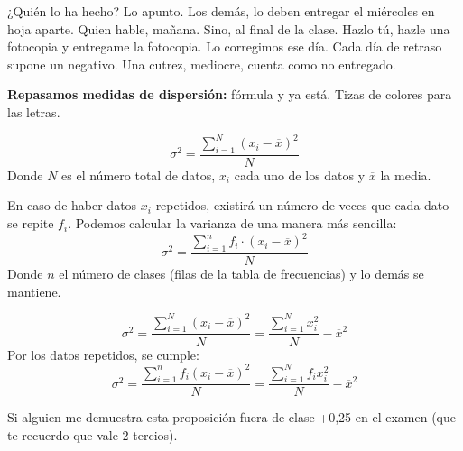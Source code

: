 ¿Quién lo ha hecho? Lo apunto. 
%
Los demás, lo deben entregar el miércoles en hoja aparte.
%
Quien hable, mañana.
%
Sino, al final de la clase.
%
Hazlo tú, hazle una fotocopia y entregame la fotocopia. 
%
Lo corregimos ese día.
%
Cada día de retraso supone un negativo.
%
Una cutrez, mediocre, cuenta como no entregado.



\textbf{Repasamos medidas de dispersión: } fórmula y ya está. Tizas de colores para las letras.

\begin{defn}[Varianza]
\[
	\sigma^2 = \frac{\displaystyle\sum_{i=1}^{N} \left(x_i-\overline{x}\right)^2}{N}
\]
Donde $N$ es el número total de datos, $x_i$ cada uno de los datos y $\overline{x}$ la media.

\obs En caso de haber datos $x_i$ repetidos, existirá un número de veces que cada dato se repite $f_i$. 
%
Podemos calcular la varianza de una manera más sencilla:
\[
	\sigma^2 = \frac{\displaystyle\sum_{i=1}^{n} f_i·\left(x_i-\overline{x}\right)^2}{N}
\]
Donde $n$ el número de clases (filas de la tabla de frecuencias) y lo demás se mantiene.
\end{defn}

\begin{prop}
	\[\sigma^2 = \frac{\displaystyle\sum_{i=1}^{N} \left(x_i-\overline{x}\right)^2}{N} = \frac{\displaystyle\sum_{i=1}^N x_i^2}{N} - \overline{x}^2\]
\obs Por los datos repetidos, se cumple:
	\[\sigma^2 = \frac{\displaystyle\sum_{i=1}^{n} f_i\left(x_i-\overline{x}\right)^2}{N} = \frac{\displaystyle\sum_{i=1}^N f_ix_i^2}{N} - \overline{x}^2\]
\end{prop}

Si alguien me demuestra esta proposición fuera de clase +0,25 en el examen (que te recuerdo que vale 2 tercios).

